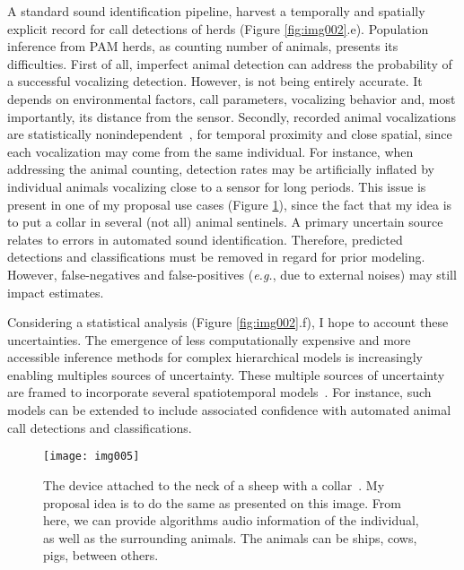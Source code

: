 A standard sound identification pipeline, harvest a temporally and spatially explicit record for call detections of herds (Figure \ref{fig:img002}.e).
Population inference from PAM herds, as counting number of animals, presents its difficulties.
First of all, imperfect animal detection can address the probability of a successful vocalizing detection.
However, is not being entirely accurate.
It depends on environmental factors, call parameters, vocalizing behavior and, most importantly, its distance from the sensor.
Secondly, recorded animal vocalizations are statistically nonindependent~\cite{lucas2015generalised}, for temporal proximity and close spatial, since each vocalization may come from the same individual.
For instance, when addressing the animal counting, detection rates may be artificially inflated by individual animals vocalizing close to a sensor for long periods.
This issue is present in one of my proposal use cases (Figure \ref{fig:img005}), since the fact that my idea is to put a collar in several (not all) animal sentinels.
A primary uncertain source relates to errors in automated sound identification.
Therefore, predicted detections and classifications must be removed in regard for prior modeling.
However, false-negatives and false-positives ({\em e.g.}, due to external noises) may still impact estimates.

Considering a statistical analysis (Figure \ref{fig:img002}.f), I hope to account these uncertainties.
The emergence of less computationally expensive and more accessible inference methods for complex hierarchical models is increasingly enabling multiples sources of uncertainty.
These multiple sources of uncertainty are framed to incorporate several spatiotemporal models~\cite{campos2016improving, kalan2015towards}.
For instance, such models can be extended to include associated confidence with automated animal call detections and classifications.


\hfill

\begin{figure}[!ht]
\texttt{[image: img005]}
\caption{The device attached to the neck of a sheep with a collar~\cite{baumker2018development}. My proposal idea is to do the same as presented on this image. From here, we can provide algorithms audio information of the individual, as well as the surrounding animals. The animals can be ships, cows, pigs, between others.}
\label{fig:img005}
\end{figure}

